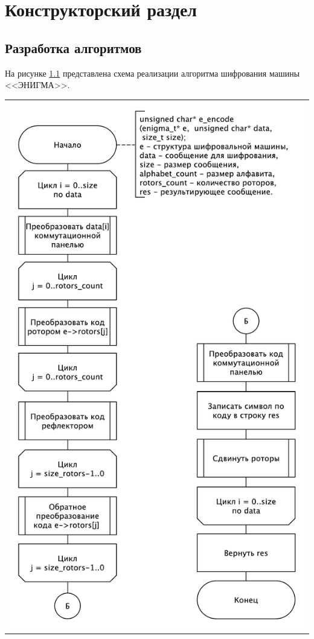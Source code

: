 \chapter{Конструкторский раздел}

\section{Разработка алгоритмов}

На рисунке \ref{img:enigma} представлена схема реализации алгоритма шифрования машины <<ЭНИГМА>>.

\begin{table}[H]
	\centering
	\begin{tabular}{p{1\linewidth}}
		\centering
		\includegraphics[width=0.5\linewidth]{inc/svg/encode.pdf}
		\captionof{figure}{Схема реализации алгоритма шифрования машины <<Энигма>>}
		\label{img:enigma}
	\end{tabular}
\end{table}
